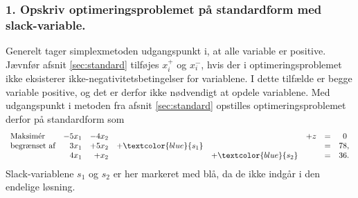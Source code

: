\subsubsection{1. Opskriv optimeringsproblemet på standardform med slack-variable.}
%
Generelt tager simplexmetoden udgangspunkt i, at alle variable er positive. Jævnfør afsnit \ref{sec:standard} tilføjes $x_i^+$ og $x_i^-$, hvis der i optimeringsproblemet ikke eksisterer ikke-negativitetsbetingelser for variablene. 
I dette tilfælde er begge variable positive, og det er derfor ikke nødvendigt at opdele variablene. 
Med udgangspunkt i metoden fra afsnit \ref{sec:standard} opstilles optimeringsproblemet derfor på standardform som
%
\begin{align*}
\begin{array}{lrrrrrlr}
\text{Maksimér}		& -5x_1 &-4x_2 &&& + z & =&0\phantom{,}\\
\text{begrænset af}	&3x_1& +5x_2	& + \textcolor{blue}{s_1} 	&&&= 	&78,\\
					&4x_1& + x_2	& & + \textcolor{blue}{s_2}	&&=	&	 36.\\
\end{array}
\end{align*}
%
Slack-variablene $s_1$ og $s_2$ er her markeret med blå, da de ikke indgår i den endelige løsning.
%

